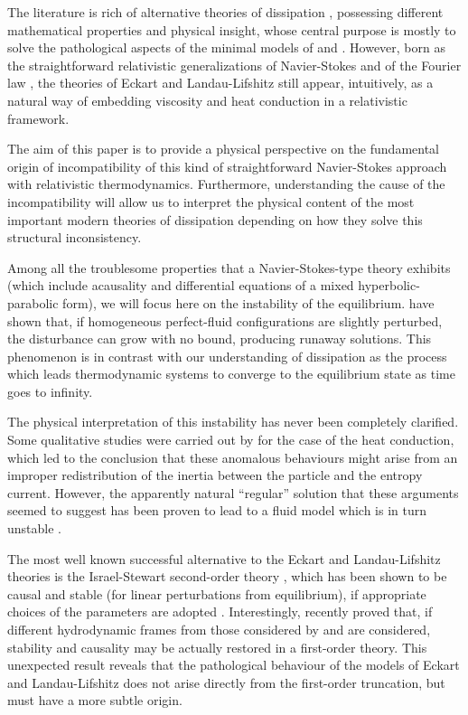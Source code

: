 \documentclass[a4paper, amsfonts, amssymb, amsmath, reprint, showkeys, nofootinbib, twoside]{revtex4-1}
\begin{document}
The literature is rich of alternative theories of dissipation \citep{Israel_Stewart_1979,Liu1986,carter1991,Kovtun2019,BulkGavassino}, possessing different mathematical properties and physical insight, whose central purpose is mostly to solve the  pathological aspects of the minimal models of \cite{Eckart1940} and \cite{landau6}. However, born as the straightforward relativistic generalizations of Navier-Stokes and of the Fourier law \citep{Weinberg1971}, the theories of Eckart and Landau-Lifshitz still appear, intuitively, as a natural way of embedding viscosity and heat conduction in a relativistic framework. 

The aim of this paper is to provide a physical perspective on the fundamental origin of incompatibility of this kind of straightforward Navier-Stokes approach with relativistic thermodynamics. Furthermore, understanding the cause of the incompatibility will allow us to interpret the physical content of the most important modern theories of dissipation depending on how they solve this structural inconsistency.


Among all the troublesome properties that a Navier-Stokes-type theory exhibits (which include acausality and differential equations of a mixed hyperbolic-parabolic form), we will focus here on the instability of the equilibrium.  \citet{Hiscock_Insatibility_first_order} have shown that, if homogeneous perfect-fluid configurations are slightly perturbed, the disturbance can grow with no bound, producing runaway solutions. This phenomenon is in contrast with our understanding of dissipation as the process which leads thermodynamic systems to converge to the equilibrium state as time goes to infinity.

The physical interpretation of this instability has never been completely clarified. Some qualitative studies were carried out by \citet{noto_rel} for the case of the heat conduction, which led to the conclusion that these anomalous behaviours might arise from an improper redistribution of the inertia between the particle and the entropy current. However, the apparently natural ``regular'' solution that these arguments seemed to suggest \citep{CarterRegular} has been proven to lead to a fluid model which is in turn unstable \citep{Olson1990}.

The most well known successful alternative to the Eckart and Landau-Lifshitz theories is the Israel-Stewart second-order theory \citep{Israel_Stewart_1979}, which has been shown to be causal and stable (for linear perturbations from equilibrium), if appropriate choices of the parameters are adopted \citep{Hishcock1983}. 
Interestingly, \cite{Bemfica_2018_conformi,Bemfica_2019_nonlinear,Kovtun2019} recently proved  that, if different hydrodynamic frames from those considered by \cite{Eckart1940} and \cite{landau6} are considered, stability and causality may be actually restored in a first-order theory. This unexpected result reveals that the pathological behaviour of the models of Eckart and Landau-Lifshitz does not arise directly from the first-order truncation, but must have a more subtle origin. 
\end{document}
